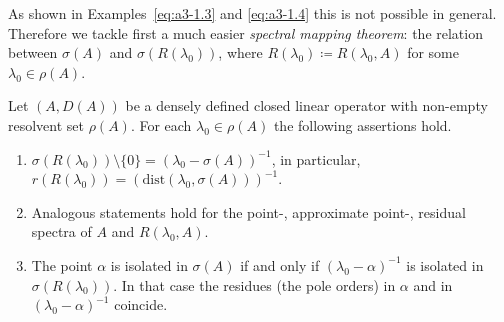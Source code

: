 As shown in Examples~\ref{eq:a3-1.3} and \ref{eq:a3-1.4} this is not possible in general.
Therefore we tackle first a much easier \emph{spectral mapping theorem}: the relation between $\sigma(A)$ and $\sigma(R(\lambda_{0}))$, where $R(\lambda_{0}) \coloneqq R(\lambda_{0},A)$ for some $\lambda_{0} \in \rho(A)$.
\begin{proposition}\label{prop:a3-2.5}
Let $(A,D(A))$ be a densely defined closed linear operator with non-empty resolvent set $\rho(A)$.
For each $\lambda_{0} \in \rho(A)$ the following assertions hold.

\begin{enumerate}[\upshape (i)]
\item 
$\sigma(R(\lambda_{0})) \setminus \{0\} = (\lambda_{0} - \sigma(A))^{-1}$, in  particular, $r(R(\lambda_{0})) = (\mathrm{dist}(\lambda_{0},\sigma(A)))^{-1}$.

\item 
Analogous statements hold for the point-, approximate point-, residual spectra of $A$ and $R(\lambda_{0},A)$.

\item 
The point $\alpha$ is isolated in $\sigma(A)$ if and only if $(\lambda_{0}-\alpha)^{-1}$ is isolated in $\sigma(R(\lambda_{0}))$.
In that case the residues (\resp the pole orders) in $\alpha$ and in $(\lambda_{0}-\alpha)^{-1}$ coincide.
\end{enumerate}
\end{proposition}
